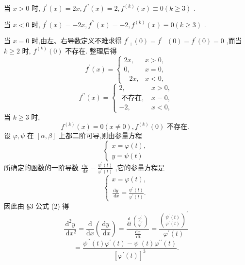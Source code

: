 \begin{solution}
当 \(x > 0\) 时, \({f}^{\prime }\left( x\right)  = {2x},{f}^{\prime \prime }\left( x\right)  = 2,{f}^{\left( k\right) }\left( x\right)  \equiv  0\left( {k \geq  3}\right)\) .

当 \(x < 0\) 时, \({f}^{\prime }\left( x\right)  =  - {2x},{f}^{\prime \prime }\left( x\right)  =  - 2,{f}^{\left( k\right) }\left( x\right)  \equiv  0\left( {k \geq  3}\right)\) .

当 \(x = 0\) 时,由左、右导数定义不难求得 \({f}^{\prime }{}_{ + }\left( 0\right)  = {f}^{\prime }{}_{ - }\left( 0\right)  = {f}^{\prime }\left( 0\right)  = 0\) ,而当 \(k \geq  2\) 时, \({f}^{\left( k\right) }\left( 0\right)\) 不存在. 整理后得
\[
{f}^{\prime }\left( x\right)  = \left\{  \begin{matrix} {2x}, & x > 0, \\  0, & x = 0, \\   - {2x}, & x < 0, \end{matrix}\right.
\]
\[
{f}^{\prime \prime }\left( x\right)  = \left\{  \begin{matrix} 2, & x > 0, \\  \text{ 不存在, } & x = 0, \\   - 2, & x < 0, \end{matrix}\right.
\]
当 \(k \geq  3\) 时,
\[
{f}^{\left( k\right) }\left( x\right)  = 0\left( {x \neq  0}\right) ,{f}^{\left( k\right) }\left( 0\right) \text{ 不存在. }
\]
设 \(\varphi ,\psi\) 在 \(\left\lbrack  {\alpha ,\beta }\right\rbrack\) 上都二阶可导,则由参量方程
\[
\left\{  \begin{array}{l} x = \varphi \left( t\right) , \\  y = \psi \left( t\right)  \end{array}\right.
\]
所确定的函数的一阶导数 \(\frac{\mathrm{d}y}{\mathrm{\;d}x} = \frac{{\psi }^{\prime }\left( t\right) }{{\varphi }^{\prime }\left( t\right) }\) ,它的参量方程是
\[
\left\{  \begin{array}{l} x = \varphi \left( t\right) , \\  \frac{\mathrm{d}y}{\mathrm{\;d}x} = \frac{{\psi }^{\prime }\left( t\right) }{{\varphi }^{\prime }\left( t\right) }. \end{array}\right.
\]
因此由 §3 公式 (2) 得
\[
\frac{{\mathrm{d}}^{2}y}{\mathrm{\;d}{x}^{2}} = \frac{\mathrm{d}}{\mathrm{d}x}\left( \frac{\mathrm{d}y}{\mathrm{\;d}x}\right)  = \frac{\frac{\mathrm{d}}{\mathrm{d}t}\left( \frac{{\psi }^{\prime }}{{\varphi }^{\prime }}\right) }{\frac{\mathrm{d}x}{\mathrm{\;d}t}} = \frac{{\left( \frac{{\psi }^{\prime }\left( t\right) }{{\varphi }^{\prime }\left( t\right) }\right) }^{\prime }}{{\varphi }^{\prime }\left( t\right) }
\]
\[
= \frac{{\psi }^{\prime \prime }\left( t\right) {\varphi }^{\prime }\left( t\right)  - {\psi }^{\prime }\left( t\right) {\varphi }^{\prime \prime }\left( t\right) }{{\left\lbrack  {\varphi }^{\prime }\left( t\right) \right\rbrack  }^{3}}. \tag{3}
\]
\end{solution}

